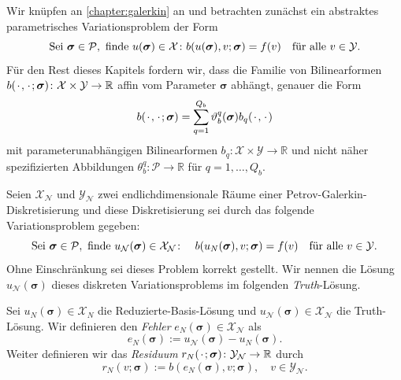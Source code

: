 \documentclass[../main.tex]{subfiles}
\begin{document}
Wir knüpfen an \cref{chapter:galerkin} an und betrachten zunächst ein abstraktes parametrisches Variationsproblem der Form
\begin{equation}
    \text{Sei } \bm \sigma \in \mathcal P, \text{ finde } u(\bm \sigma) \in \mathcal X \colon b(u(\bm \sigma), v; \bm \sigma) = f(v) \quad \fa v \in \mathcal Y.
\end{equation}
Für den Rest dieses Kapitels fordern wir, dass die Familie von Bilinearformen $b(\blank, \blank; \bm \sigma) \colon \mathcal X \times \mathcal Y \to \mathbb{R}$ affin vom Parameter $\bm \sigma$ abhängt, genauer die Form
\begin{equation}
     b(\blank, \blank; \bm \sigma) = \sum_{q = 1}^{Q_b} \theta_{b}^{q}(\bm \sigma) b_{q}(\blank, \blank)
 \end{equation}
 mit parameterunabhängigen Bilinearformen $b_{q} \colon \mathcal X \times \mathcal Y \to \mathbb{R}$ und nicht näher spezifizierten Abbildungen $\theta_{b}^{q} \colon \mathcal P \to \mathbb{R}$ für $q = 1, \dots, Q_{b}$.

\begin{Definition}
    Seien $\mathcal X_{\mathcal N}$ und $\mathcal Y_{\mathcal N}$ zwei endlichdimensionale Räume einer Petrov-Galerkin-Diskretisierung und diese Diskretisierung sei durch das folgende Variationsproblem gegeben:
    \begin{equation}
        \text{Sei } \bm \sigma \in \mathcal P, \text{ finde } u_{\mathcal N}(\bm \sigma) \in \mathcal X_{\mathcal N} \colon \quad b(u_{N}(\bm \sigma), v; \bm \sigma) = f(v) \quad \fa v \in \mathcal Y.
    \end{equation}
    Ohne Einschränkung sei dieses Problem korrekt gestellt.
    Wir nennen die Lösung $u_{\mathcal N}(\bm \sigma)$ dieses diskreten Variationsproblems im folgenden \emph{Truth}-Lösung.
\end{Definition}

\begin{Definition}
    Sei $u_{N}(\bm \sigma) \in \mathcal X_{N}$ die Reduzierte-Basis-Lösung und $u_{\mathcal N}(\bm \sigma) \in \mathcal X_{\mathcal N}$ die Truth-Lösung.
    Wir definieren den \emph{Fehler} $e_{N}(\bm \sigma) \in \mathcal X_{\mathcal N}$ als
    \begin{equation}
        e_{N}(\bm \sigma) := u_{\mathcal N}(\bm \sigma) - u_{N}(\bm \sigma).
    \end{equation}
    Weiter definieren wir das \emph{Residuum} $r_{N}(\blank; \bm \sigma) \colon \mathcal Y_{\mathcal N} \to \mathbb{R}$ durch
    \begin{equation}
    \label{eq:variationsproblem_residuum}
        r_{N}(v; \bm \sigma) := b(e_{N}(\bm \sigma), v; \bm \sigma), \quad v \in \mathcal Y_{\mathcal N}.
    \end{equation}
\end{Definition}
\end{document}
